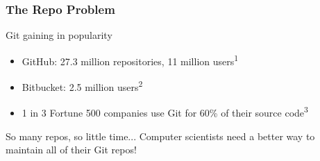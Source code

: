 \documentclass{beamer}
\begin{document}


\begin{frame}
    \centering
    \frametitle{The Repo Problem}
	\begin{block}{Git gaining in popularity}
		\begin{itemize}
			\item GitHub: 27.3 million repositories, 11 million users\textsuperscript{1}
			\item Bitbucket: 2.5 million users\textsuperscript{2}
			\item 1 in 3 Fortune 500 companies use Git for 60\% of their source code\textsuperscript{3}
		\end{itemize}
	\end{block}    
	
	\pause 
	
    \begin{block}{So many repos, so little time...}
    		Computer scientists need a better way to maintain all of their Git repos!      
    \end{block}
    	
\end{frame}    
\end{document}
